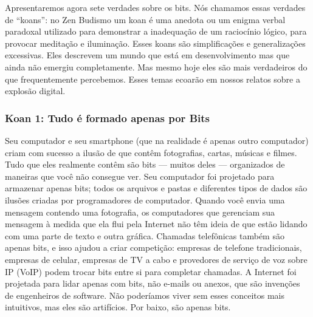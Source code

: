 Apresentaremos agora sete verdades sobre os bits. Nós chamamos essas verdades de
``koans'': no Zen Budismo um koan é uma anedota ou um enigma verbal paradoxal
utilizado para demonstrar a inadequação de um raciocínio lógico, para provocar
meditação e iluminação. Esses koans são simplificações e generalizações
excessivas. Eles descrevem um mundo que está em desenvolvimento mas que ainda
não emergiu completamente. Mas mesmo hoje eles são mais verdadeiros do que
frequentemente percebemos. Esses temas ecoarão em nossos relatos sobre a
explosão digital.


\subsubsection*{Koan 1: Tudo é formado apenas por Bits}
\label{cap1:exp-dig-koans:1}
Seu computador e seu smartphone (que na realidade é apenas outro computador)
criam com sucesso a ilusão de que contêm fotografias, cartas, músicas e
filmes. Tudo que eles realmente contêm são bits --- muitos deles --- organizados
de maneiras que você não consegue ver. Seu computador foi projetado para
armazenar apenas bits; todos os arquivos e pastas e diferentes tipos de dados
são ilusões criadas por programadores de computador. Quando você envia uma
mensagem contendo uma fotografia, os computadores que gerenciam sua mensagem à
medida que ela flui pela Internet não têm ideia de que estão lidando com uma
parte de texto e outra gráfica. Chamadas telefônicas também são apenas bits, e
isso ajudou a criar competição: empresas de telefone tradicionais, empresas de
celular, empresas de TV a cabo e provedores de serviço de voz sobre IP (VoIP)
podem trocar bits entre si para completar chamadas. A Internet foi projetada
para lidar apenas com bits, não e-mails ou anexos, que são invenções de
engenheiros de software. Não poderíamos viver sem esses conceitos mais
intuitivos, mas eles são artifícios. Por baixo, são apenas bits.

